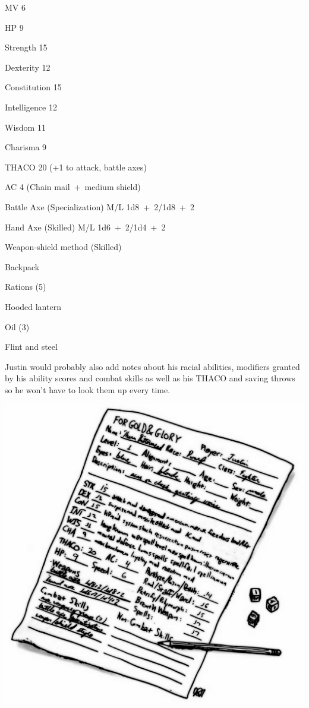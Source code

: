 \begin{multicols}{2}
\noindent MV 6

\noindent HP 9

\noindent Strength 15

\noindent Dexterity 12

\noindent Constitution 15

\noindent Intelligence 12

\noindent Wisdom 11

\noindent Charisma 9

\columnbreak

\noindent THACO 20 (+1 to attack, battle axes)

\noindent AC 4 (Chain mail~+~medium shield)

\noindent Battle Axe (Specialization) M/L 1d8~+~2/1d8~+~2

\noindent Hand Axe (Skilled) M/L 1d6~+~2/1d4~+~2

\noindent Weapon-shield method (Skilled)

\noindent Backpack

\noindent \hspace{2em}Rations (5)

\noindent \hspace{2em}Hooded lantern

\noindent \hspace{2em}Oil (3)

\noindent \hspace{2em}Flint and steel

\vspace{1em}

Justin would probably also add notes about his racial abilities, modifiers granted by his ability scores and combat skills as well as his THACO and saving throws so he won't have to look them up every time.

\noindent\includegraphics[width=\columnwidth]{bittermead.pdf}\label{bittermead}


\end{multicols}

